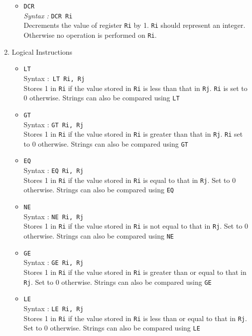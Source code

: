 \documentclass[11pt]{article}
\begin{document}
\begin{enumerate}
\begin{itemize}
\item  \texttt{DCR}\\
\textit{Syntax :} \texttt{DCR Ri}\\
Decrements the value of register \texttt{Ri} by 1. \texttt{Ri} should represent an integer. Otherwise no operation is performed on \texttt{Ri}.

\end{itemize}


\item Logical Instructions
\begin{itemize}
\item \texttt{LT}\\
Syntax :\texttt{ LT Ri, Rj}\\
Stores 1 in \texttt{Ri} if the value stored in \texttt{Ri} is less than that in \texttt{Rj}. \texttt{Ri} is set to 0 otherwise. Strings can also be compared using \texttt{LT}

\item \texttt{GT}\\
Syntax : \texttt{GT Ri, Rj}\\
Stores 1 in \texttt{Ri} if the value stored in \texttt{Ri} is greater than that in \texttt{Rj}. \texttt{Ri} set to 0 otherwise. Strings can also be compared using \texttt{GT}

\item \texttt{EQ}\\
Syntax : \texttt{EQ Ri, Rj}\\
Stores 1 in \texttt{Ri} if the value stored in \texttt{Ri} is equal to that in \texttt{Rj}. Set to 0 otherwise. Strings can also be compared using \texttt{EQ}

\item \texttt{NE}\\
Syntax : \texttt{NE Ri, Rj}\\
Stores 1 in \texttt{Ri} if the value stored in \texttt{Ri} is not equal to that in \texttt{Rj}. Set to 0 otherwise. Strings can also be compared using \texttt{NE}

\item \texttt{GE} \\
Syntax : \texttt{GE Ri, Rj} \\
Stores 1 in \texttt{Ri} if the value stored in \texttt{Ri} is greater than or equal to that in \texttt{Rj}. Set to 0 otherwise. Strings can also be compared using \texttt{GE}

\item \texttt{LE}\\
Syntax : \texttt{LE Ri, Rj}\\
Stores 1 in \texttt{Ri} if the value stored in \texttt{Ri} is less than or equal to that in \texttt{Rj}. Set to 0 otherwise. Strings can also be compared using \texttt{LE} \\
\end{itemize}


\end{enumerate}
\end{document}
